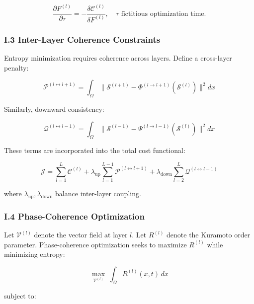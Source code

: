 \documentclass[12pt]{article}
\theoremstyle{plain}
\begin{document}
\begin{equation}
\frac{\partial F^{(l)}}{\partial \tau} = - \frac{\delta \mathcal{C}^{(l)}}{\delta F^{(l)}}, \quad \tau \text{ fictitious optimization time.}
\end{equation}

\subsubsection*{I.3 Inter-Layer Coherence Constraints}

Entropy minimization requires coherence across layers. Define a cross-layer penalty:

\begin{equation}
\mathcal{P}^{(l \leftrightarrow l+1)} = \int_\Omega \| \mathcal{S}^{(l+1)} - \Phi^{(l \to l+1)}(\mathcal{S}^{(l)}) \|^2 dx
\end{equation}

Similarly, downward consistency:

\begin{equation}
\mathcal{Q}^{(l \leftrightarrow l-1)} = \int_\Omega \| \mathcal{S}^{(l-1)} - \Psi^{(l \to l-1)}(\mathcal{S}^{(l)}) \|^2 dx
\end{equation}

These terms are incorporated into the total cost functional:

\begin{equation}
\mathcal{J} = \sum_{l=1}^L \mathcal{C}^{(l)} + \lambda_{\mathrm{up}} \sum_{l=1}^{L-1} \mathcal{P}^{(l \leftrightarrow l+1)} + \lambda_{\mathrm{down}} \sum_{l=2}^{L} \mathcal{Q}^{(l \leftrightarrow l-1)}
\end{equation}

where \(\lambda_{\mathrm{up}}, \lambda_{\mathrm{down}}\) balance inter-layer coupling.

\subsubsection*{I.4 Phase-Coherence Optimization}

Let \(\mathcal{V}^{(l)}\) denote the vector field at layer \(l\). Let \(R^{(l)}\) denote the Kuramoto order parameter. Phase-coherence optimization seeks to maximize \(R^{(l)}\) while minimizing entropy:

\begin{equation}
\max_{\mathcal{V}^{(l)}} \; \int_\Omega R^{(l)}(x,t) \, dx
\end{equation}

subject to:
\end{document}
